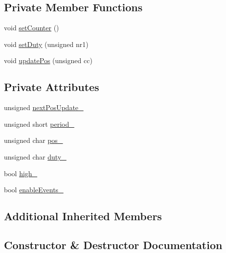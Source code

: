 \subsection*{Private Member Functions}
\begin{DoxyCompactItemize}
\item 
void \hyperlink{classgambatte_1_1DutyUnit_ac47abbcf178693d44cf747459afaebf2}{set\+Counter} ()
\item 
void \hyperlink{classgambatte_1_1DutyUnit_a1cc5dd0b49b65816128ee3d52303c27d}{set\+Duty} (unsigned nr1)
\item 
void \hyperlink{classgambatte_1_1DutyUnit_ad972c3aa4b864ef85abc3c84ef1a24dd}{update\+Pos} (unsigned cc)
\end{DoxyCompactItemize}
\subsection*{Private Attributes}
\begin{DoxyCompactItemize}
\item 
unsigned \hyperlink{classgambatte_1_1DutyUnit_a79613bf1e29067922acc8404aa965cc5}{next\+Pos\+Update\+\_\+}
\item 
unsigned short \hyperlink{classgambatte_1_1DutyUnit_ab7744a1a9d16bb7226a401e5e02452fe}{period\+\_\+}
\item 
unsigned char \hyperlink{classgambatte_1_1DutyUnit_a357ce9a2491fe91fa402d21b1ca7805e}{pos\+\_\+}
\item 
unsigned char \hyperlink{classgambatte_1_1DutyUnit_a35b7a7b47842abd813f91ab73cbe1dd2}{duty\+\_\+}
\item 
bool \hyperlink{classgambatte_1_1DutyUnit_afe7cae5f88b8e9f5402cb7b4970c4a47}{high\+\_\+}
\item 
bool \hyperlink{classgambatte_1_1DutyUnit_a9f7634538a43cd88af58f406b92f55d7}{enable\+Events\+\_\+}
\end{DoxyCompactItemize}
\subsection*{Additional Inherited Members}


\subsection{Constructor \& Destructor Documentation}
\mbox{\label{classgambatte_1_1DutyUnit_a4313410af8c15cb68eb276df92639b86}} 
